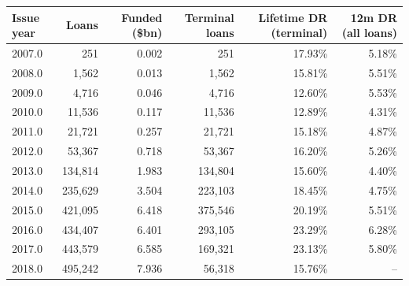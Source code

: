 \begin{tabular}{lrrrrr}
\toprule
Issue year & Loans & Funded (\$bn) & Terminal loans & Lifetime DR (terminal) & 12m DR (all loans) \\
\midrule
2007.0 & 251 & 0.002 & 251 & 17.93\% & 5.18\% \\
2008.0 & 1,562 & 0.013 & 1,562 & 15.81\% & 5.51\% \\
2009.0 & 4,716 & 0.046 & 4,716 & 12.60\% & 5.53\% \\
2010.0 & 11,536 & 0.117 & 11,536 & 12.89\% & 4.31\% \\
2011.0 & 21,721 & 0.257 & 21,721 & 15.18\% & 4.87\% \\
2012.0 & 53,367 & 0.718 & 53,367 & 16.20\% & 5.26\% \\
2013.0 & 134,814 & 1.983 & 134,804 & 15.60\% & 4.40\% \\
2014.0 & 235,629 & 3.504 & 223,103 & 18.45\% & 4.75\% \\
2015.0 & 421,095 & 6.418 & 375,546 & 20.19\% & 5.51\% \\
2016.0 & 434,407 & 6.401 & 293,105 & 23.29\% & 6.28\% \\
2017.0 & 443,579 & 6.585 & 169,321 & 23.13\% & 5.80\% \\
2018.0 & 495,242 & 7.936 & 56,318 & 15.76\% & -- \\
\bottomrule
\end{tabular}
